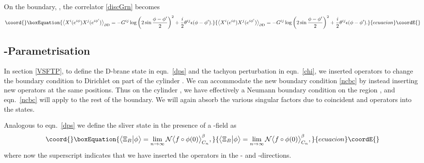 \documentclass[letterpaper,12pt]{article}
\def\Pcm#1{{\mathcal{#1}}}
\def\er#1{eqn.~\eqref{#1}}
\providecommand{\Dp}{\textup{D}p}
\begin{document}
On the boundary, \coordHE{}, the correlator \eqref{discGrn} becomes
\begin{equation}\coord{}\boxEquation{
\big\langle X^i(e^{i\phi})X^j(e^{i\phi'}) \big\rangle_{\partial\textup{D}} = 
   -G^{ij}\log \left(2\sin\frac{\phi-\phi'}2\right)^2 + \frac{i}2 \theta^{ij} \epsilon(\phi-\phi')
.}{
\big\langle X^i(e^{i\phi})X^j(e^{i\phi'}) \big\rangle_{\partial\textup{D}} = 
   -G^{ij}\log \left(2\sin\frac{\phi-\phi'}2\right)^2 + \frac{i}2 \theta^{ij} \epsilon(\phi-\phi')
.}{ecuacion}\coordE{}\end{equation}


\subsection{\coordHE{}-Parametrisation}

In section \ref{VSFTP}, to define the D-brane state \myHighlight{$|\Dp\rangle$}\coordHE{} in \er{dps} and the 
tachyon perturbation \coordHE{} in \er{chi}, we inserted operators \myHighlight{$\sigma^\pm$}\coordHE{} to 
change the boundary condition to Dirichlet on part of the cylinder \coordHE{}. We can accommodate 
the new boundary condition \eqref{ncbc} by instead inserting new operators \myHighlight{$\beta^\pm$}\coordHE{} at the
same positions. Thus on the cylinder \coordHE{}, we have effectively a Neumann boundary condition
on the region \coordHE{}, and \er{ncbc} will apply to the rest of the boundary.
We will again absorb the various singular factors due to coincident \myHighlight{$\beta^+$}\coordHE{} and \myHighlight{$\beta^-$}\coordHE{} 
operators into the states.

Analogous to \er{dps} we define the sliver state in the presence of a \coordHE{}-field as
\begin{equation}\coord{}\boxEquation{
\label{xiB}
\big\langle \Xi_B \big| \phi \big\rangle = \lim_{n \rightarrow \infty} 
                       \Pcm{N}\big\langle f \circ \phi(0) \big\rangle^{\beta}_{C_n}
,}{
\big\langle \Xi_B \big| \phi \big\rangle = \lim_{n \rightarrow \infty} 
                       \Pcm{N}\big\langle f \circ \phi(0) \big\rangle^{\beta}_{C_n}
,}{ecuacion}\coordE{}\end{equation}
where now the superscript indicates that we have inserted the operators \myHighlight{$\beta^\pm$}\coordHE{} in
the \coordHE{}- and \coordHE{}-directions.
\end{document}
